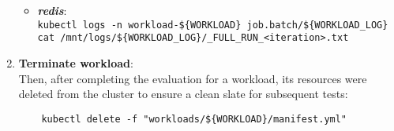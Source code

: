 \begin{enumerate}
\begin{itemize}
        \item \textbf{\textit{redis}}:\\
        \verb!kubectl logs -n workload-${WORKLOAD} job.batch/${WORKLOAD_LOG}!\\
        \verb!cat /mnt/logs/${WORKLOAD_LOG}/_FULL_RUN_<iteration>.txt!
    \end{itemize}

    \item \textbf{Terminate workload}:\\
    Then, after completing the evaluation for a workload, its resources were deleted from the cluster to ensure a clean slate for subsequent tests:

    \begin{verbatim}
    kubectl delete -f "workloads/${WORKLOAD}/manifest.yml"
    \end{verbatim}
\end{enumerate}

